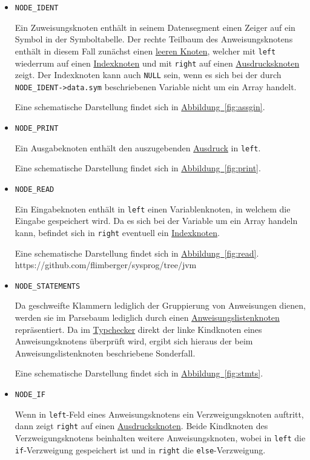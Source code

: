 \begin{itemize}
\item \texttt{NODE\_IDENT}

Ein Zuweisungsknoten enthält in seinem Datensegment einen Zeiger auf ein Symbol in der Symboltabelle.
Der rechte Teilbaum des Anweisungsknotens enthält in diesem Fall zunächst einen \hyperref[sec:nonenode]{leeren Knoten},
welcher mit \texttt{left} wiederrum auf einen \hyperref[sec:indexnode]{Indexknoten} und mit \texttt{right} auf einen \hyperref[sec:expnode]{Ausdrucksknoten} zeigt.
Der Indexknoten kann auch \texttt{NULL} sein,
wenn es sich bei der durch \texttt{NODE\_IDENT->data.sym} beschriebenen Variable nicht um ein Array handelt.

Eine schematische Darstellung findet sich in \hyperref[fig:assgin]{Abbildung~\ref{fig:assgin}}.

\item \texttt{NODE\_PRINT}

Ein Ausgabeknoten enthält den auszugebenden \hyperref[sec:expnode]{Ausdruck} in \texttt{left}.

Eine schematische Darstellung findet sich in \hyperref[fig:print]{Abbildung~\ref{fig:print}}.

\item \texttt{NODE\_READ}

Ein Eingabeknoten enthält in \texttt{left} einen Variablenknoten,
in welchem die Eingabe gespeichert wird.
Da es sich bei der Variable um ein Array handeln kann,
befindet sich in \texttt{right} eventuell ein \hyperref[sec:indexnode]{Indexknoten}.

Eine schematische Darstellung findet sich in \hyperref[fig:read]{Abbildung~\ref{fig:read}}.
https://github.com/flimberger/sysprog/tree/jvm
\item \texttt{NODE\_STATEMENTS}

Da geschweifte Klammern lediglich der Gruppierung von Anweisungen dienen,
werden sie im Parsebaum lediglich durch einen \hyperref[sec:stmtsnode]{Anweisungslistenknoten} repräsentiert.
Da im \hyperref[sec:typecheck]{Typchecker} direkt der linke Kindknoten eines Anweisungsknotens überprüft wird,
ergibt sich hieraus der beim Anweisungslistenknoten beschriebene Sonderfall.

Eine schematische Darstellung findet sich in \hyperref[fig:stmts]{Abbildung~\ref{fig:stmts}}.

\item \texttt{NODE\_IF}

Wenn in \texttt{left}-Feld eines Anweisungsknotens ein Verzweigungsknoten auftritt,
dann zeigt \texttt{right} auf einen \hyperref[sec:expnode]{Ausdrucksknoten}.
Beide Kindknoten des Verzweigungsknotens beinhalten weitere Anweisungsknoten,
wobei in \texttt{left} die \texttt{if}-Verzweigung gespeichert ist und in \texttt{right} die \texttt{else}-Verzweigung.


\end{itemize}
